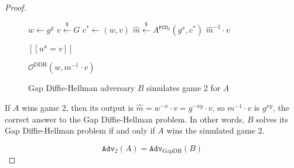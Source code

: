 \documentclass[journal=tches,submission]{iacrtrans}
\newcommand{\pco}{\texttt{PCO}}
\newcommand{\leftsample}{\stackrel{\$}{\leftarrow}}
\newcommand{\llbrack}{[\![}
\newcommand{\rrbrack}{]\!]}
\newcommand{\adv}{\texttt{Adv}}
\begin{document}
\begin{proof}
\begin{figure}[h]
        \begin{minipage}[t]{0.45\textwidth}
            \begin{algorithm}[H]
                \caption*{$B^{\mathcal{O}^\text{DDH}}(g, g^x, g^y)$}
                \begin{algorithmic}[1]
                    \State $w \leftarrow g^y$
                    \State $v \leftsample G$
                    \State $c^\ast \leftarrow (w, v)$
                    \State $\hat{m} \leftsample A^{\pco_2}(g^x, c^\ast)$
                    \State \Return $\hat{m}^{-1}\cdot v$
                \end{algorithmic}
            \end{algorithm}
        \end{minipage}
        \begin{minipage}[t]{0.45\textwidth}
            \begin{algorithm}[H]
                \caption*{$\mathcal{O}^\text{DDH}(u, v)$}
                \begin{algorithmic}[1]
                    \State \Return $\llbrack u^x = v \rrbrack$
                \end{algorithmic}
            \end{algorithm}\vspace{-0.3cm}
            \begin{algorithm}[H]
                \caption*{$\pco_2(m, c=(w, v))$}
                \begin{algorithmic}[1]
                    \State \Return $\mathcal{O}^\text{DDH}(w, m^{-1}\cdot v)$
                \end{algorithmic}
            \end{algorithm}
        \end{minipage}

        \caption{Gap Diffie-Hellman adversary $B$ simulates game 2 for $A$}\label{fig:ow-pca-to-gap-dh}
    \end{figure}

    If $A$ wins game 2, then its output is $\hat{m} = w^{-x}\cdot v = g^{-xy}\cdot v$, so $m^{-1}\cdot v$ is $g^{xy}$, the correct answer to the Gap Diffie-Hellman problem. In other words, $B$ solves its Gap Diffie-Hellman problem if and only if $A$ wins the simulated game 2.

    \begin{equation*}
        \adv_2(A) = \adv_\text{GapDH}(B)
    \end{equation*}
\end{proof}
\end{document}
